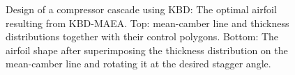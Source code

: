 \begin{figure}[h!]
\begin{minipage}[b]{1\linewidth}
 \centering
\end{minipage}
\caption{Design of a compressor cascade using KBD: The optimal airfoil resulting from KBD-MAEA. Top: mean-camber line and thickness distributions together with their control polygons. Bottom: The airfoil shape after superimposing the thickness distribution on the mean-camber line and rotating it at the desired stagger angle.} 
\label{CBRDrelaRes}
\end{figure}



%
